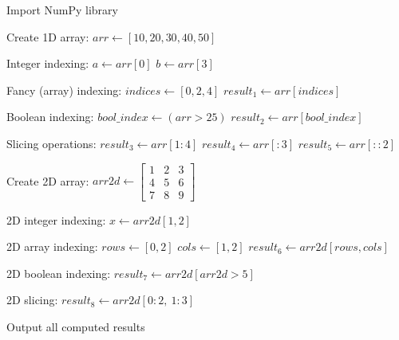 \begin{algorithm}
\caption{NumPy Array Indexing and Slicing Operations}
\begin{algorithmic}[1]

\STATE Import NumPy library

\STATE Create 1D array:
\STATE $arr \gets [10, 20, 30, 40, 50]$

\STATE Integer indexing:
\STATE $a \gets arr[0]$
\STATE $b \gets arr[3]$

\STATE Fancy (array) indexing:
\STATE $indices \gets [0, 2, 4]$
\STATE $result_1 \gets arr[indices]$

\STATE Boolean indexing:
\STATE $bool\_index \gets (arr > 25)$
\STATE $result_2 \gets arr[bool\_index]$

\STATE Slicing operations:
\STATE $result_3 \gets arr[1:4]$
\STATE $result_4 \gets arr[:3]$
\STATE $result_5 \gets arr[::2]$

\STATE Create 2D array:
\STATE $arr2d \gets \begin{bmatrix} 1 & 2 & 3 \\ 4 & 5 & 6 \\ 7 & 8 & 9 \end{bmatrix}$

\STATE 2D integer indexing:
\STATE $x \gets arr2d[1,2]$

\STATE 2D array indexing:
\STATE $rows \gets [0,2]$
\STATE $cols \gets [1,2]$
\STATE $result_6 \gets arr2d[rows, cols]$

\STATE 2D boolean indexing:
\STATE $result_7 \gets arr2d[arr2d > 5]$

\STATE 2D slicing:
\STATE $result_8 \gets arr2d[0:2,\ 1:3]$

\STATE Output all computed results

\end{algorithmic}
\end{algorithm}